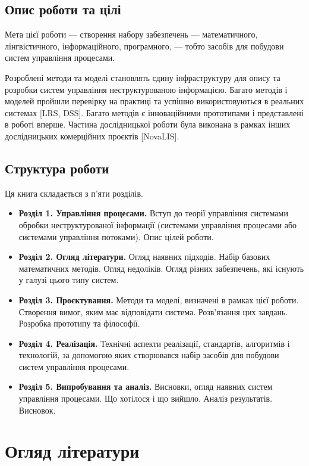 \documentclass{memoir}
\begin{document}
\section{Опис роботи та цілі}

Мета цієї роботи — створення набору забезпечень — математичного, лінгвістичного, інформаційного, програмного, — тобто засобів для побудови систем управління процесами.

Розроблені методи та моделі становлять єдину інфраструктуру для опису та розробки систем управління неструктурованою інформацією. Багато методів і моделей пройшли перевірку на практиці та успішно використовуються в реальних системах [LRS, DSS]. Багато методів є інноваційними прототипами і представлені в роботі вперше. Частина дослідницької роботи була виконана в рамках інших дослідницьких комерційних проєктів [NovaLIS].

\section{Структура роботи}

Ця книга складається з п’яти розділів.

\begin{itemize}
    \item \textbf{Розділ 1. Управління процесами.} Вступ до теорії управління системами обробки неструктурованої інформації (системами управління процесами або системами управління потоками). Опис цілей роботи.
    \item \textbf{Розділ 2. Огляд літератури.} Огляд наявних підходів. Набір базових математичних методів. Огляд недоліків. Огляд різних забезпечень, які існують у галузі цього типу систем.
    \item \textbf{Розділ 3. Проєктування.} Методи та моделі, визначені в рамках цієї роботи. Створення вимог, яким має відповідати система. Розв’язання цих завдань. Розробка прототипу та філософії.
    \item \textbf{Розділ 4. Реалізація.} Технічні аспекти реалізації, стандартів, алгоритмів і технологій, за допомогою яких створювався набір засобів для побудови систем управління процесами.
    \item \textbf{Розділ 5. Випробування та аналіз.} Висновки, огляд наявних систем управління процесами. Що хотілося і що вийшло. Аналіз результатів. Висновок.
\end{itemize}

\chapter{Огляд літератури}
\end{document}
